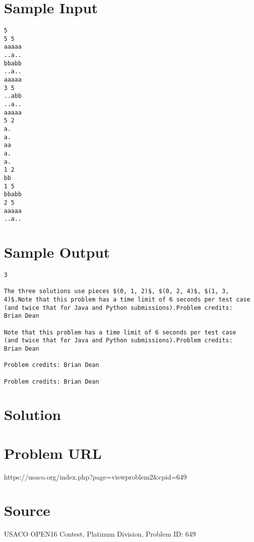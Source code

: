\documentclass[12pt]{article}
\begin{document}
\section*{Sample Input}
\begin{verbatim}
5
5 5
aaaaa
..a..
bbabb
..a..
aaaaa
3 5
..abb
..a..
aaaaa
5 2
a.
a.
aa
a.
a.
1 2
bb
1 5
bbabb
2 5
aaaaa
..a..
\end{verbatim}

\section*{Sample Output}
\begin{verbatim}
3

The three solutions use pieces $(0, 1, 2)$, $(0, 2, 4)$, $(1, 3, 4)$.Note that this problem has a time limit of 6 seconds per test case (and twice that for Java and Python submissions).Problem credits: Brian Dean

Note that this problem has a time limit of 6 seconds per test case (and twice that for Java and Python submissions).Problem credits: Brian Dean

Problem credits: Brian Dean

Problem credits: Brian Dean
\end{verbatim}

\section*{Solution}


\section*{Problem URL}
https://usaco.org/index.php?page=viewproblem2&cpid=649

\section*{Source}
USACO OPEN16 Contest, Platinum Division, Problem ID: 649
\end{document}
